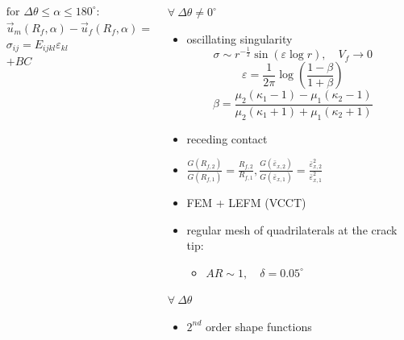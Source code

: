 \documentclass[first,firstsupp,lastsupp,last,hyperref,table]{ETHclass}
\begin{document}
\begin{frame}
\begin{columns}
\begin{column}{0.6\textwidth}
\begin{columns}
\begin{column}{0.675\columnwidth}
\begin{equation*}
\begin{aligned}
&\text{for } \Delta\theta\leq\alpha\leq 180^{\circ}:\\
&\overrightarrow{u}_{m}\left(R_{f},\alpha\right)-\overrightarrow{u}_{f}\left(R_{f},\alpha\right)=0\\
&\sigma_{ij}=E_{ijkl}\varepsilon_{kl}\\
&+BC
\end{aligned}
\end{equation*}
\end{column}
\end{columns}
\end{column}
\begin{column}{0.375\textwidth}
\scriptsize
$\forall\ \Delta\theta\neq0^{\circ}$
\begin{itemize}[label=]
\item oscillating singularity
\vspace{-0.25cm}
\begin{equation*}
\sigma\sim r^{-\frac{1}{2}}\sin\left(\varepsilon\log r\right),\quad V_{f}\rightarrow 0
\end{equation*}
{\tiny
\begin{equation*}
\varepsilon=\frac{1}{2\pi}\log\left(\frac{1-\beta}{1+\beta}\right)
\end{equation*}
\begin{equation*}
\beta=\frac{\mu_{2}\left(\kappa_{1}-1\right)-\mu_{1}\left(\kappa_{2}-1\right)}{\mu_{2}\left(\kappa_{1}+1\right)+\mu_{1}\left(\kappa_{2}+1\right)}
\end{equation*}}
\item receding contact
\item $\frac{G\left(R_{f,2}\right)}{G\left(R_{f,1}\right)}=\frac{R_{f,2}}{R_{f,1}},\frac{G\left(\bar{\varepsilon}_{x,2}\right)}{G\left(\bar{\varepsilon}_{x,1}\right)}=\frac{\bar{\varepsilon}^{2}_{x,2}}{\bar{\varepsilon}^{2}_{x,1}}$
\item FEM + LEFM (VCCT)
\item regular mesh of quadrilaterals at the crack tip:
\begin{itemize}[label=-]
\item $AR\sim 1,\quad\delta=0.05^{\circ}$
\end{itemize}
\end{itemize}
$\forall\ \Delta\theta$
\begin{itemize}[label=]
\item $2^{nd}$ order shape functions
\end{itemize}
\end{column}
\end{columns}
\end{frame}
\end{document}
